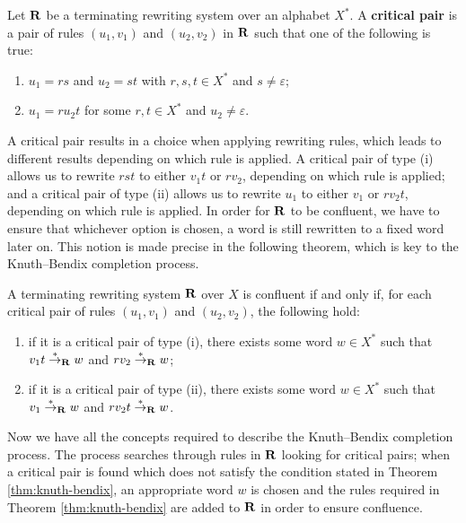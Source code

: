 \begin{definition}
  \label{def:critical-pair}
  Let $\mathbf{R}$ be a terminating rewriting system over an alphabet $X^*$.  A
  \textbf{critical pair} is a pair of rules $(u_1, v_1)$ and $(u_2, v_2)$ in
  $\mathbf{R}$ such that one of the following is true:
  \begin{enumerate}[\rm(i)]
  \item $u_1 = rs$ and $u_2 = st$ with $r,s,t \in X^*$ and
    $s \neq \varepsilon$;
  \item $u_1 = ru_2t$ for some $r,t \in X^*$ and $u_2 \neq \varepsilon$.
  \end{enumerate}
\end{definition}

A critical pair results in a choice when applying rewriting rules, which leads
to different results depending on which rule is applied.  A critical pair of
type (i) allows us to rewrite $rst$ to either $v_1t$ or $rv_2$, depending on
which rule is applied; and a critical pair of type (ii) allows us to rewrite
$u_1$ to either $v_1$ or $rv_2t$, depending on which rule is applied.  In order
for $\mathbf{R}$ to be confluent, we have to ensure that whichever option is chosen, a
word is still rewritten to a fixed word later on.  This notion is made precise
in the following theorem, which is key to the Knuth--Bendix completion process.

\begin{theorem}
  \label{thm:knuth-bendix}
  A terminating rewriting system $\mathbf{R}$ over $X$ is confluent if and only if,
  for each critical pair of rules $(u_1, v_1)$ and $(u_2, v_2)$, the following
  hold:
  \begin{enumerate}[\rm(i)]
  \item if it is a critical pair of type (i), there exists some word $w \in X^*$
    such that $v_1t \stackrel{*}{\to}_{\mathbf{R}} w$ and $rv_2 \stackrel{*}{\to}_{\mathbf{R}} w$;
  \item if it is a critical pair of type (ii), there exists some word
    $w \in X^*$ such that $v_1 \stackrel{*}{\to}_{\mathbf{R}} w$ and $rv_2t \stackrel{*}{\to}_{\mathbf{R}} w$.
  \end{enumerate}
\end{theorem}

Now we have all the concepts required to describe the Knuth--Bendix completion
process.  The process searches through rules in $\mathbf{R}$ looking for critical
pairs; when a critical pair is found which does not satisfy the
condition stated in Theorem \ref{thm:knuth-bendix}, an appropriate word $w$ is
chosen and the rules required in Theorem \ref{thm:knuth-bendix} are
added to $\mathbf{R}$ in order to ensure confluence.

